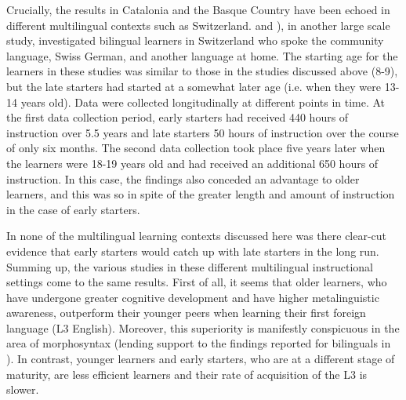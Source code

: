 \documentclass[output=paper,colorlinks,citecolor=brown,nonflat]{langsci/langscibook}
\begin{document}
Crucially, the results in Catalonia and the Basque Country have been echoed in different multilingual contexts such as Switzerland. \citet{Pfenninger2014} and \citet{PfenningerSingleton2017, PfenningerSingleton2019}), in another large scale study, investigated bilingual learners in Switzerland who spoke the community language, Swiss German, and another language at home. The starting age for the learners in these studies was similar to those in the studies discussed above (8-9), but the late starters had started at a somewhat later age (i.e. when they were 13-14 years old). Data were collected longitudinally at different points in time. At the first data collection period, early starters had received 440 hours of instruction over 5.5 years and late starters 50 hours of instruction over the course of only six months. The second data collection took place five years later when the learners were 18-19 years old and had received an additional 650 hours of instruction. In this case, the findings also conceded an advantage to older learners, and this was so in spite of the greater length and amount of instruction in the case of early starters.

In none of the multilingual learning contexts discussed here was there clear-cut evidence that early starters would catch up with late starters in the long run. Summing up, the various studies in these different multilingual instructional settings come to the same results. First of all, it seems that older learners, who have undergone greater cognitive development and have higher metalinguistic awareness, outperform their younger peers when learning their first foreign language (L3 English). Moreover, this superiority is manifestly conspicuous in the area of morphosyntax (lending support to the findings reported for bilinguals in \citealt{KrashenEtAl1979}). In contrast, younger learners and early starters, who are at a different stage of maturity, are less efficient learners and their rate of acquisition of the L3 is slower.
\end{document}
